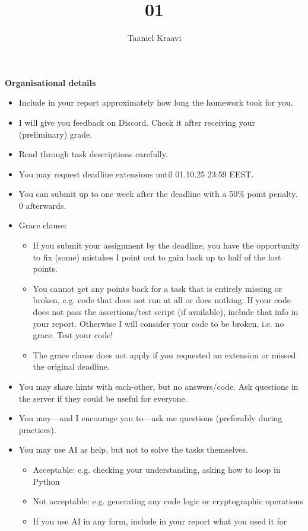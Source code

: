 \documentclass{homework}
\title{01}
\author{Taaniel Kraavi}
\date{\DTMdate{2025-10-04}}
\begin{document}
\maketitle

\textbf{Organisational details}

\begin{itemize}
  \item Include in your report approximately how long the homework took for you.
  \item I will give you feedback on Discord.
  Check it after receiving your (preliminary) grade.
  \item Read through task descriptions carefully.
  \item You may request deadline extensions until 01.10.25 23:59 EEST.
  \item You can submit up to one week after the deadline with a 50\% point penalty.
  0 afterwards.
  \item Grace clause:
  \begin{itemize}
    \item If you submit your assignment by the deadline, you have the opportunity to fix (some) mistakes I point out to gain back up to half of the lost points.
    \item You cannot get any points back for a task that is entirely missing or broken, e.g. code that does not run at all or does nothing.
    If your code does not pass the assertions/test script (if available), include that info in your report.
    Otherwise I will consider your code to be broken, i.e. no grace.
    Test your code!
    \item The grace clause does not apply if you requested an extension or missed the original deadline.
  \end{itemize}
  \item You may share hints with each-other, but no answers/code.
  Ask questions in the server if they could be useful for everyone.
  \item You may---and I encourage you to---ask me questions (preferably during practices).
  \item You may use AI as help, but not to solve the tasks themselves.
  \begin{itemize}
    \item Acceptable: e.g. checking your understanding, asking how to loop in Python
    \item Not acceptable: e.g. generating any code logic or cryptographic operations
    \item If you use AI in any form, include in your report what you used it for

\end{itemize}
\end{itemize}
\end{document}

